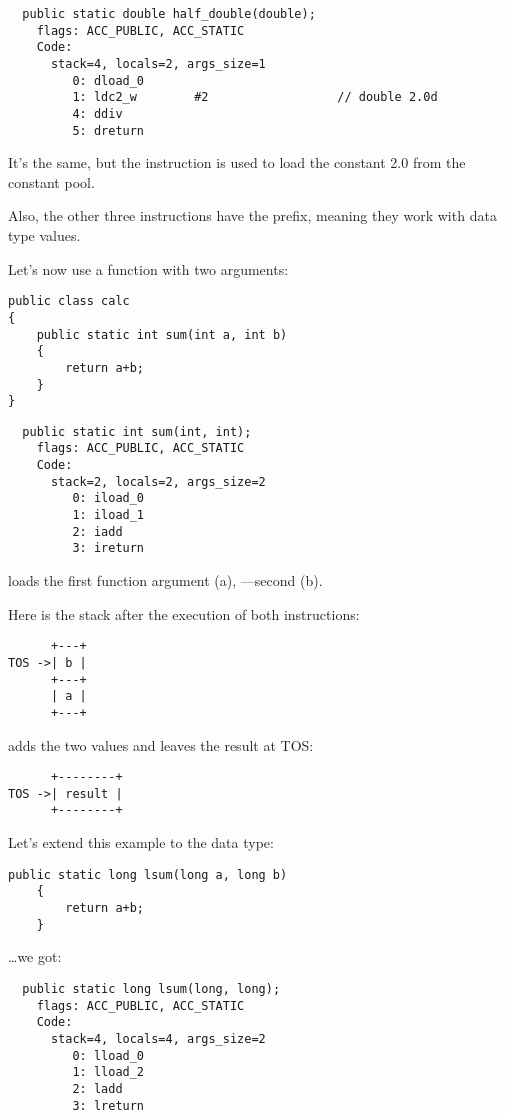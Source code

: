 \begin{lstlisting}
  public static double half_double(double);
    flags: ACC_PUBLIC, ACC_STATIC
    Code:
      stack=4, locals=2, args_size=1
         0: dload_0       
         1: ldc2_w        #2                  // double 2.0d
         4: ddiv          
         5: dreturn       
\end{lstlisting}

It's the same, but the  instruction is used to load the constant 
2.0 from the constant pool.

Also, the other three instructions have the  prefix, 
meaning they work with  data type values.


Let's now use a function with two arguments:


\begin{lstlisting}[style=customjava]
public class calc
{
	public static int sum(int a, int b)
	{
		return a+b;
	}
}
\end{lstlisting}

\begin{lstlisting}
  public static int sum(int, int);
    flags: ACC_PUBLIC, ACC_STATIC
    Code:
      stack=2, locals=2, args_size=2
         0: iload_0       
         1: iload_1       
         2: iadd          
         3: ireturn       
\end{lstlisting}

 loads the first function argument (a), ---second (b).

Here is the stack after the execution of both instructions:


\begin{lstlisting}
      +---+
TOS ->| b |
      +---+
      | a |
      +---+
\end{lstlisting}

 adds the two values and leaves the result at \ac{TOS}:


\begin{lstlisting}
      +--------+
TOS ->| result |
      +--------+
\end{lstlisting}

Let's extend this example to the  data type:


\begin{lstlisting}[style=customjava]
	public static long lsum(long a, long b)
	{
		return a+b;
	}
\end{lstlisting}

\dots we got:

\begin{lstlisting}
  public static long lsum(long, long);
    flags: ACC_PUBLIC, ACC_STATIC
    Code:
      stack=4, locals=4, args_size=2
         0: lload_0       
         1: lload_2       
         2: ladd          
         3: lreturn       
\end{lstlisting}

